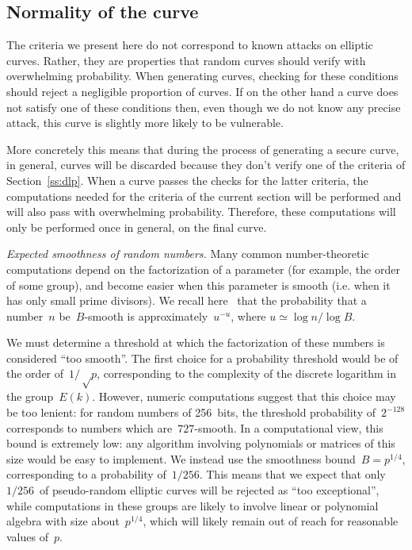 \documentclass[twocolumn,letterpaper,10pt]{article}
\begin{document}
\subsection{Normality of the curve}
\label{ss:normal}

The criteria we present here do not correspond to
known attacks on elliptic curves.
Rather, they are properties that random curves should verify
with overwhelming probability.
When generating curves, checking for these conditions
should reject a negligible proportion of curves.
If on the other hand a curve does not satisfy one of these conditions
then, even though we do not know any precise attack,
this curve is slightly more likely to be vulnerable.

More concretely this means that during the process of generating
a secure curve, in general, curves will be discarded
because they don't verify one of the criteria of Section~\ref{ss:dlp}.
When a curve passes the checks for the latter criteria,
the computations needed for the criteria of the current section
will be performed and will also pass with overwhelming probability.
Therefore, these computations will only be performed once in general,
on the final curve.
\medbreak\par\textit{Expected smoothness of random numbers.} %
Many common number-theoretic computations depend on
the factorization of a parameter (for example, the order of some group),
and become easier when this parameter is smooth
(i.e. when it has only small prime divisors).
We recall here~\cite{jnt1983cep} that the probability that
a number~$n$ be~$B$-smooth is approximately~$u^{-u}$,
where $u ≃ \log n / \log B$.

We must determine a threshold at which the factorization of these
numbers is considered ``too smooth''.
The first choice for a probability threshold would be
of the order of~$1/√p$, corresponding to the complexity of
the discrete logarithm in the group~$E(k)$.
However, numeric computations suggest that this choice may be too lenient:
for random numbers of 256~bits, the threshold probability of~$2^{-128}$
corresponds to numbers which are~$727$-smooth.
In a computational view, this bound is extremely low:
any algorithm involving polynomials or matrices of this size
would be easy to implement.
We instead use the smoothness bound~$B = p^{1/4}$,
corresponding to a probability of~$1/256$.
This means that we expect that only
$1/256$~of pseudo-random elliptic curves
will be rejected as ``too exceptional'',
while computations in these groups
are likely to involve linear or polynomial algebra
with size about~$p^{1/4}$,
which will likely remain out of reach for reasonable values of~$p$.
\end{document}
